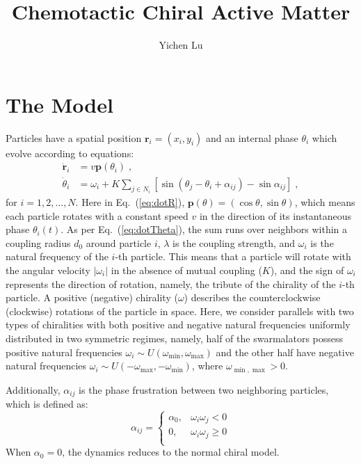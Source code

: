 \documentclass{article}
\title{\textbf{Chemotactic Chiral Active Matter}}
\author{Yichen Lu}
\begin{document}
\maketitle

\tableofcontents

\newpage
\section{\label{sec:model}The Model}

Particles have a spatial position $\mathbf{r}_i=\left( x_i, y_i \right)$ and an internal phase $\theta_i$ which evolve according to equations:
\begin{subequations}
    \label{eq:totalDynamics}
    \begin{align}
        \dot{\mathbf{r}}_i&=v\mathbf{p}\left( \theta _i \right)\label{eq:dotR}\;,\\
        \dot{\theta}_i&=\omega _i+K\sum_{j\in N_i}{\left[ \sin \left( \theta _j-\theta _i+\alpha _{ij} \right) -\sin \alpha _{ij} \right]}\label{eq:dotTheta}\;,
    \end{align}
\end{subequations}
for $i=1,2,\ldots,N$. Here in Eq.~(\ref{eq:dotR}), $\mathbf{p}\left( \theta \right) =\left( \cos \theta ,\sin \theta \right)$, which means each particle rotates with a constant speed $v$ in the direction of its instantaneous phase $\theta_i (t)$. As per Eq.~(\ref{eq:dotTheta}), the sum runs over neighbors within a coupling radius $d_0$ around particle $i$, $\lambda$ is the coupling strength, and $\omega_i$ is the natural frequency of the $i$-th particle. This means that a particle will rotate with the angular velocity $|\omega_i |$ in the absence of mutual coupling ($K$), and the sign of $\omega_i$ represents the direction of rotation, namely, the tribute of the chirality of the $i$-th particle. A positive (negative) chirality ($\omega$) describes the counterclockwise (clockwise) rotations of the particle in space. Here, we consider parallels with two types of chiralities with both positive and negative natural frequencies uniformly distributed in two symmetric regimes, namely, half of the swarmalators possess positive natural frequencies $\omega_i \sim U\left( \omega _{\min},\omega _{\max} \right)$ and the other half have negative natural frequencies $\omega_i \sim U\left( -\omega _{\max},-\omega _{\min} \right)$, where $\omega _{\min, \max}>0$.

Additionally, $\alpha_{ij}$ is the phase frustration between two neighboring particles, which is defined as:
\begin{equation}
    \alpha _{ij}=\begin{cases}
        \alpha _0,&		\omega _i\omega _j<0\\
        0,&		\omega _i\omega _j\geqslant 0\\
    \end{cases}
\end{equation}
When $\alpha_0=0$, the dynamics reduces to the normal chiral model.
\end{document}
